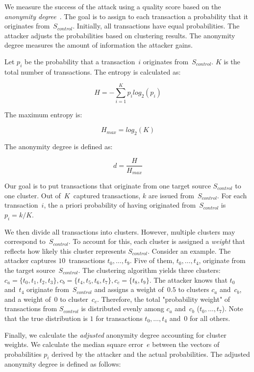 We measure the success of the attack using a quality score based on the \textit{anonymity degree}~\cite{Diaz2002}.
The goal is to assign to each transaction a probability that it originates from~$S_{control}$.
Initially, all transactions have equal probabilities.
The attacker adjusts the probabilities based on clustering results.
The anonymity degree measures the amount of information the attacker gains.

Let $p_i$ be the probability that a transaction~$i$ originates from~$S_{control}$.
$K$ is the total number of transactions.
The entropy is calculated as:

\[
H = -\sum_{i=1}^K p_i log_2(p_i)
\]

The maximum entropy is:

\[
H_{max} = log_2(K)
\]

The anonymity degree is defined as:

\[
d = \frac{H}{H_{max}}
\]

Our goal is to put transactions that originate from one target source $S_{control}$ to one cluster.
Out of~$K$~captured transactions, $k$ are issued from~$S_{control}$.
For each transaction~$i$, the a priori probability of having originated from~$S_{control}$ is $p_i = k / K$.

We then divide all transactions into clusters.
However, multiple clusters may correspond to~$S_{control}$.
To account for this, each cluster is assigned a \textit{weight} that reflects how likely this cluster represents $S_{control}$.
Consider an example.
The attacker captures $10$~transactions $t_0, \dots, t_9$.
Five of them, $t_0, \dots, t_4$, originate from the target source~$S_{control}$.
The clustering algorithm yields three clusters: $c_a = \{t_0, t_1, t_2, t_3\}, c_b = \{t_4, t_5, t_6, t_7\}, c_c = \{t_8, t_9\}$.
The attacker knows that $t_0$ and~$t_4$ originate from~$S_{control}$ and assigns a weight of~$0.5$ to clusters $c_a$ and~$c_b$, and a weight of~$0$ to cluster~$c_c$.
Therefore, the total "probability weight" of transactions from $S_{control}$ is distributed evenly among $c_a$ and~$c_b$ ($t_0, \dots, t_7$).
Note that the true distribution is $1$ for transactions $t_0, \dots, t_4$ and~$0$ for all others.

Finally, we calculate the \textit{adjusted} anonymity degree accounting for cluster weights.
We calculate the median square error~$e$ between the vectors of probabilities $p_i$ derived by the attacker and the actual probabilities.
The adjusted anonymity degree is defined as follows:

